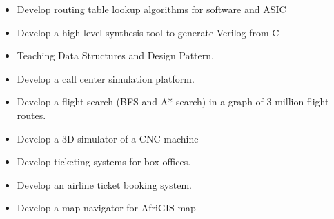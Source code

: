 \begin{itemize}
	\item Develop routing table lookup algorithms for software and ASIC
	\item Develop a high-level synthesis tool to generate Verilog from C
	\item Teaching Data Structures and Design Pattern.
\end{itemize}

\divider

\begin{itemize}
	\item Develop a call center simulation platform.
\end{itemize}

\divider

\begin{itemize}
	\item Develop a flight search (BFS and A* search) in a graph of 3 million flight routes.
\end{itemize}

\divider

\begin{itemize}
	\item Develop a 3D simulator of a CNC machine
\end{itemize}

\divider

\begin{itemize}
	\item Develop ticketing systems for box offices.
\end{itemize}

\divider

\begin{itemize}
	\item Develop an airline ticket booking system.
\end{itemize}


\divider

\begin{itemize}
	\item Develop a map navigator for AfriGIS map
\end{itemize}

\cvproject{}
